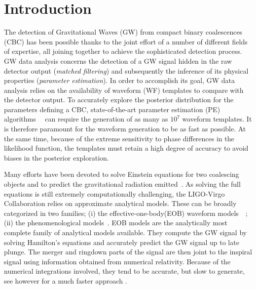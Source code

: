 \section{Introduction}
The detection of Gravitational Waves (GW) from compact binary coalescences (CBC) has been possible thanks to the joint effort of a number of different fields of expertise, all joining together to achieve the sophisticated detection process. GW data analysis concerns the detection of a GW signal hidden in the raw detector output (\textit{matched filtering}) and subsequently the inference of its physical properties (\textit{parameter estimation}). In order to accomplish its goal, GW data analysis relies on the availability of waveform (WF) templates to compare with the detector output.
To accurately explore the posterior distribution for the parameters defining a CBC, state-of-the-art parameter estimation (PE) algorithms~\cite{Aasi:2013jjl}~\cite{Veitch2014wba} can require the generation of as many as $10^7$ waveform templates. It is therefore paramount for the waveform generation to be as fast as possible. At the same time, because of the extreme sensitivity to phase differences in the likelihood  function, the templates must retain a high degree of accuracy to avoid biases in the posterior exploration.


Many efforts have been devoted to solve Einstein equations for two coalescing objects and to predict the gravitational radiation emitted~\cite{}.
As solving the full equations is still extremely computationally challenging, the LIGO-Virgo Collaboration relies on approximate analytical models. 
These can be broadly categorized in  two families; (i) the effective-one-body(EOB) waveform 
models~\cite{Damour1999EOB}~\cite{Damour2009EOB}; (ii) the phenomenological models~\cite{}. 
EOB models are the analytically most complete family of analytical models available. 
They compute the GW signal by solving Hamilton's equations and accurately predict the GW signal up to late plunge.
The merger and ringdown  parts of the signal are then joint to the inspiral signal using information obtained from numerical relativity. 
Because of the numerical integrations involved, they tend to be accurate, but slow to generate, see however \cite{} 
for a much faster approach . 

